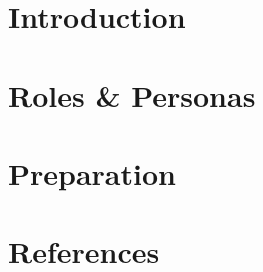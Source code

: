 % 

\section[Intro]{Introduction}


% 

\section[Roles]{Roles \& Personas}



\section[Prep]{Preparation}


% 

\section[Refs]{References}

